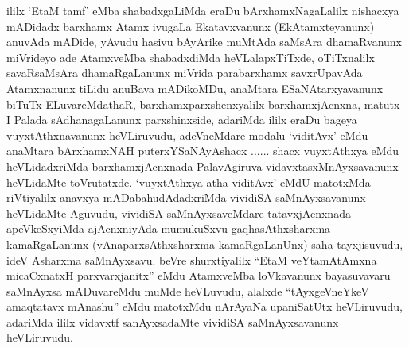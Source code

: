 \begin{artha}
ililx \mdash  `EtaM tamf' eMba shabadxgaLiMda eraDu bArxhamxNagaLalilx nishacxya mADidadx barxhamx Atamx ivugaLa Ekatavxvanunx (EkAtamxteyanunx) anuvAda mADide, yAvudu hasivu bAyArike muMtAda saMsAra dhamaRvanunx miVrideyo ade AtamxveMba shabadxdiMda heVLalapxTiTxde, oTiTxnalilx savaRsaMsAra dhamaRgaLanunx miVrida parabarxhamx savxrUpavAda Atamxnanunx tiLidu anuBava mADikoMDu, anaMtara ESaNAtarxyavanunx biTuTx ELuvareMdathaR, barxhamxparxshenxyalilx barxhamxjAcnxna, matutx I Palada sAdhanagaLanunx parxshinxside, adariMda ililx eraDu bageya vuyxtAthxnavanunx heVLiruvudu, adeVneMdare modalu `viditAvx' eMdu anaMtara bArxhamxNAH puterxYSaNAyAshacx ...... shacx vuyxtAthxya eMdu heVLidadxriMda barxhamxjAcnxnada PalavAgiruva vidavxtasxMnAyxsavanunx heVLidaMte toVrutatxde. `vuyxtAthxya atha viditAvx' eMdU matotxMda riVtiyalilx anavxya mADabahudAdadxriMda vividiSA saMnAyxsavanunx heVLidaMte Aguvudu, vividiSA saMnAyxsaveMdare tatavxjAcnxnada apeVkeSxyiMda ajAcnxniyAda mumukuSxvu gaqhasAthxsharxma kamaRgaLanunx (vAnaparxsAthxsharxma kamaRgaLanUnx) saha tayxjisuvudu, ideV Asharxma saMnAyxsavu. beVre shurxtiyalilx ``EtaM veYtamAtAmxna micaCxnatxH parxvarxjanitx'' eMdu AtamxveMba loVkavanunx bayasuvavaru saMnAyxsa mADuvareMdu muMde heVLuvudu, alalxde ``tAyxgeVneYkeV amaqtatavx mAnashu'' eMdu matotxMdu nArAyaNa upaniSatUtx heVLiruvudu, adariMda ililx vidavxtf sanAyxsadaMte vividiSA saMnAyxsavanunx heVLiruvudu.
\end{artha}

